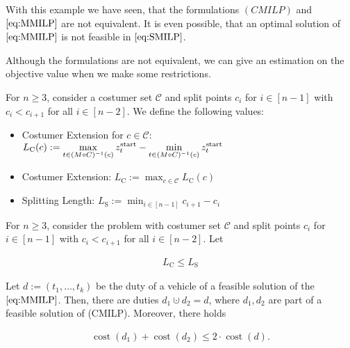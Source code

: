 With this example we have seen, that the formulations $(CMILP)$ and $\eqref{eq:MMILP}$ are not equivalent. It is even possible, that an optimal solution of $\eqref{eq:MMILP}$ is not feasible in $\eqref{eq:SMILP}$.

Although the formulations are not equivalent, we can give an estimation on the objective value when we make some restrictions.

\begin{definition}

For $n\geq 3$, consider a costumer set $\mathcal{C}$ and split points $c_i$ for $i\in[n-1]$ with $c_i<c_{i+1}$ for all $i\in[n-2]$. We define the following values:

\begin{itemize}
	\item{Costumer Extension for $c\in\mathcal{C}$: $\displaystyle{L_{\operatorname{C}}(c) := \max_{t\in(M\circ C)^{-1}(c)}z^{\operatorname{start}}_t - \min_{t\in(M\circ C)^{-1}(c)}z^{\operatorname{start}}_t}$}
	\item{Costumer Extension: $\displaystyle{L_{\operatorname{C}} := \max_{c\in\mathcal{C}} L_{\operatorname{C}}(c)}$}
	\item{Splitting Length: $\displaystyle{L_{\operatorname{S}} := \min_{i\in[n-1]} c_{i+1}-c_i}$}
\end{itemize}

\end{definition}

\begin{theorem}

For $n\geq 3$, consider the problem with costumer set $\mathcal{C}$ and split points $c_i$ for $i\in[n-1]$ with $c_i<c_{i+1}$ for all $i\in[n-2]$. Let

\begin{align}
\label{eq:LCLS}
	L_{\operatorname{C}}\leq L_{\operatorname{S}}
\end{align}

Let $d:=\left(t_1,\dots,t_k\right)$ be the duty of a vehicle of a feasible solution of the $\eqref{eq:MMILP}$. Then, there are duties $d_1\cupdot d_2=d$, where $d_1,d_2$ are part of a feasible solution of (CMILP). Moreover, there holds

\begin{align}
	\operatorname{cost}\left(d_1\right)+\operatorname{cost}\left(d_2\right)\leq 2\cdot\operatorname{cost}\left(d\right).
\end{align}

\end{theorem}

